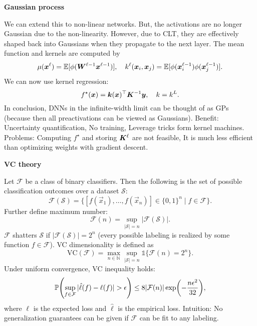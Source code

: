 \documentclass[10pt]{article}
\newenvironment{topic}[1]
{\textbf{\sffamily \colorbox{black}{\rlap{\textbf{\textcolor{white}{#1}}}\hspace{\linewidth}\hspace{-2\fboxsep}}}}
{}
\newenvironment{subtopic}[1]
{\begin{center}\textbf{\sffamily #1}\end{center}}
{}
\begin{document}
\begin{multicols*}{3}
\begin{topic}{Bayesian learning}
\begin{subtopic}{Gaussian process}
            We can extend this to non-linear networks. But, the activations are no longer Gaussian due to the
            non-linearity. However, due to CLT, they are effectively shaped back into Gaussians when they
            propagate to the next layer. The mean function and kernels are computed by \[
                \mu(\bm{x}^{\ell}) = \mathbb{E}[\phi(\bm{W}^{\ell-1} \bm{x}^{\ell-1})], \quad k^{\ell}(\bm{x}_i, \bm{x}_j) = \mathbb{E}[\phi(\bm{x}^{\ell-1}_i) \phi(\bm{x}^{\ell-1}_j)].
            \]
            We can now use kernel regression: \[
                f^\star(\bm{x}) = \bm{k}(\bm{x})^\top \bm{K}^{-1}\bm{y}, \quad k = k^L.
            \]
            In conclusion, DNNs in the infinite-width limit can be thought of as GPs (because then all
            preactivations can be viewed as Gaussians). Benefit: Uncertainty quantification, No training,
            Leverage tricks form kernel machines. Problems: Computing $f^\star$ and storing $\bm{K}^{\ell}$
            are not feasible, It is much less efficient than optimizing weights with gradient descent.

        \end{subtopic}

    \end{topic}

    \begin{topic}{Statistical learning theory}

        \begin{subtopic}{VC theory}
            Let $\mathcal{F}$ be a class of binary classifiers. Then the following is the set of possible classification outcomes over a dataset $\mathcal{S}$: \[
                \mathcal{F}(\mathcal{S}) = \{ [f(\vec{x}_1), \ldots, f(\vec{x}_n)] \in \{ 0,1 \}^n \mid f \in \mathcal{F} \}.
            \]
            Further define maximum number: \[
                \mathcal{F}(n) = \sup_{|\mathcal{S}| = n} |\mathcal{F}(\mathcal{S})|.
            \]
            $\mathcal{F}$ shatters $\mathcal{S}$ if $|\mathcal{F}(\mathcal{S})| = 2^n$ (every
            possible labeling is realized by some function $f \in \mathcal{F}$). VC dimensionality is defined as \[
                \mathrm{VC}(\mathcal{F}) = \max_{n \in \mathbb{N}} \sup_{|\mathcal{S}|=n} \mathbb{1}\{ \mathcal{F}(n) = 2^n \}.
            \]
            Under uniform convergence, VC inequality holds: \[
                \mathbb{P}\lft( \sup_{f \in \mathcal{F}} |\hat{\ell}(f) - \ell(f)| > \epsilon \rgt) \leq 8 |\mathcal{F}(n)| \exp \lft( -\frac{n \epsilon^2}{32} \rgt),
            \]
            where $\ell$ is the expected loss and $\hat{\ell}$ is the empirical loss. Intuition: No
            generalization guarantees can be given if $\mathcal{F}$ can be fit to any labeling.


\end{subtopic}
\end{topic}
\end{multicols*}
\end{document}
